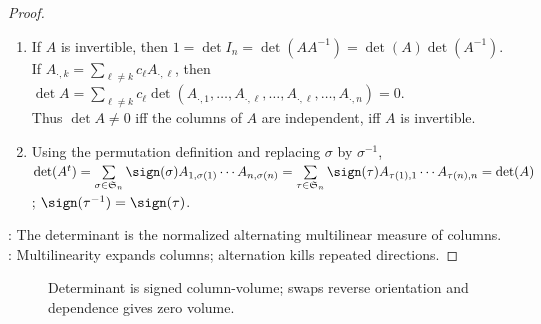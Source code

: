 \begin{theorem}
\begin{proof}
\begin{enumerate}[label=(\roman*)]
$F(A_{\cdot,1},\ldots,A_{\cdot,n}) =\sum\limits_{i_1,\ldots,i_n}A_{i_1,1}\cdots A_{i_n,n}F(\mathbf{e}_{i_1},\ldots,\mathbf{e}_{i_n}) =\sum\limits_{\sigma\in\mathfrak{S}_n}\sign(\sigma)F(I_n)A_{\sigma(1),1}\cdots A_{\sigma(n),n}$.\\
The terms with repeated $i_j$ vanish by alternation, and the surviving ordered bases differ from $(\mathbf{e}_1,\ldots,\mathbf{e}_n)$ by sign of permutation. For $H(B)=\det(AB)$, map $H$ is alternating multilinear and $H(I_n)=\det A$.\\
Hence $\det(AB)=H(B)=H(I_n)\det B=\det(A)\det(B)$.
\item If $A$ is invertible, then $1=\det I_n=\det(AA^{-1})=\det(A)\det(A^{-1})$.\\
If $A_{\cdot,k}=\sum\limits_{\ell\neq k}c_\ell A_{\cdot,\ell}$, then $\det A=\sum\limits_{\ell\neq k}c_\ell\det(A_{\cdot,1},\ldots,A_{\cdot,\ell},\ldots,A_{\cdot,\ell},\ldots,A_{\cdot,n})=0$.\\
Thus $\det A\neq0$ iff the columns of $A$ are independent, iff $A$ is invertible.
\item Using the permutation definition and replacing $\sigma$ by $\sigma^{-1}$,\\
$\det(A^t) =\sum\limits_{\sigma\in\mathfrak{S}_n}\sign(\sigma)A_{1,\sigma(1)}\cdots A_{n,\sigma(n)} =\sum\limits_{\tau\in\mathfrak{S}_n}\sign(\tau)A_{\tau(1),1}\cdots A_{\tau(n),n} =\det(A)$; $\sign(\tau^{-1})=\sign(\tau)$.
\end{enumerate}
: The determinant is the normalized alternating multilinear measure of columns.\\
: Multilinearity expands columns; alternation kills repeated directions.
\end{proof}
\end{theorem}

\begin{figure}[H]
  \centering
  
  \caption{Determinant is signed column-volume; swaps reverse orientation and dependence gives zero volume.}
  \label{fig:determinant-column-geometry}
\end{figure}

